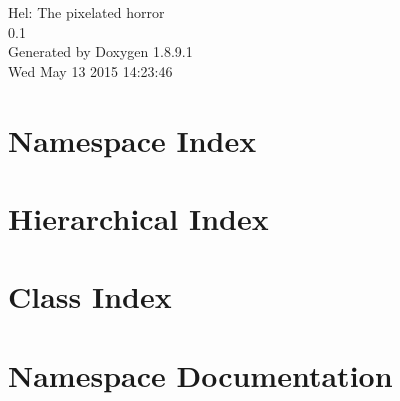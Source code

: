\documentclass[twoside]{book}
\newcommand{\+}{\discretionary{\mbox{\scriptsize$\hookleftarrow$}}{}{}}
\newcommand{\clearemptydoublepage}{%
  \newpage{\pagestyle{empty}\cleardoublepage}%
}
\begin{document}
\hypersetup{pageanchor=false,
             bookmarks=true,
             bookmarksnumbered=true,
             pdfencoding=unicode
            }
\begin{titlepage}
\vspace*{7cm}
\begin{center}%
{\Large Hel\+: The pixelated horror \\[1ex]\large 0.\+1 }\\
\vspace*{1cm}
{\large Generated by Doxygen 1.8.9.1}\\
\vspace*{0.5cm}
{\small Wed May 13 2015 14:23:46}\\
\end{center}
\end{titlepage}
\clearemptydoublepage
\tableofcontents
\clearemptydoublepage
{}
\hypersetup{pageanchor=true}

\chapter{Namespace Index}

\chapter{Hierarchical Index}

\chapter{Class Index}

\chapter{Namespace Documentation}











\end{document}
